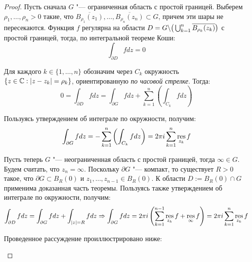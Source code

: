 \begin{proof}
	Пусть сначала $G$ "--- ограниченная область с простой границей. Выберем $\rho_1, \dotsc, \rho_n > 0$ такие, что $\overline{B_{\rho_1}(z_1)}, \dotsc, \overline{B_{\rho_n}(z_n)} \subset G$, причем эти шары не пересекаются. Функция $f$ регулярна на области $D = G \backslash \big(\bigcup_{k = 1}^n\overline{B_{\rho_k}(z_k)}\big)$ с простой границей, тогда, по интегральной теореме Коши:
	\[\int_{\partial D} fdz = 0\]
	
	Для каждого $k \in \{1, \dotsc, n\}$ обозначим через $C_k$ окружность $\{z \in \mathbb{C}: |z - z_k| = \rho_k\}$, ориентированную \textit{по часовой стрелке}. Тогда:
	\[0 = \int_{\partial D} fdz = \int_{\partial G} fdz + \sum_{k = 1}^n\left(\int_{C_k}fdz\right)\]
	
	Пользуясь утверждением об интеграле по окружности, получим:
	\[\int_{\partial G} fdz = -\sum_{k = 1}^n\left(\int_{C_k}fdz\right) = 2 \pi i\sum_{k = 1}^n\operatorname*{res}_{z_k}f\]
	
	Пусть теперь $G$ "--- неограниченная область с простой границей, тогда $\infty \in G$. Будем считать, что $z_n = \infty$. Поскольку $\partial G$ "--- компакт, то существует $R > 0$ такое, что $\partial G \subset B_R(0)$ и $z_1, \dotsc, z_{n-1} \in B_R(0)$. К области $D := B_R(0) \cap G$ применима доказанная часть теоремы. Пользуясь также утверждением об интеграле по окружности, получим:
	\[\int_{\partial D} fdz = \int_{\partial G}fdz + \int_{|z| = R}fdz \Rightarrow \int_{\partial G}fdz = 2\pi i\left(\sum_{k = 1}^{n-1}\operatorname*{res}_{z_k}f + \operatorname*{res}_{\infty}f\right) = 2\pi i\sum_{k = 1}^{n}\operatorname*{res}_{z_k}f\]
	
	Проведенное рассуждение проиллюстрировано ниже:
	\begin{center}
\end{center}
\end{proof}

